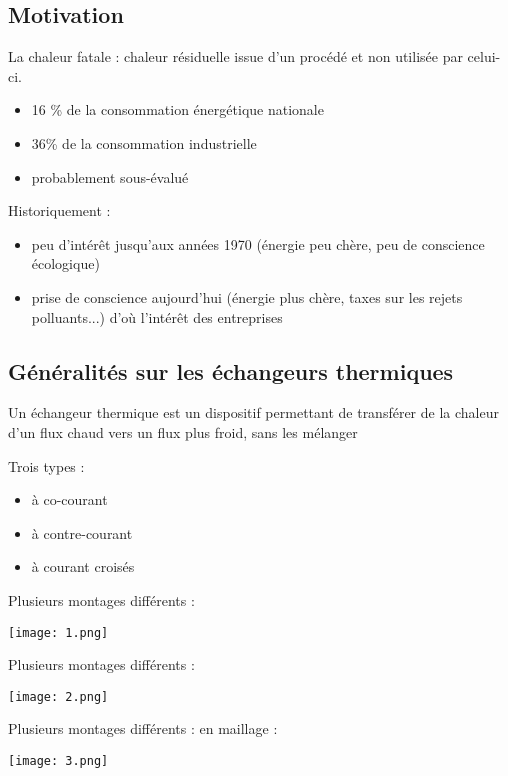 \documentclass{beamer}
\begin{document}
\subsection{Motivation}
\begin{frame}
La chaleur fatale : chaleur résiduelle issue d'un procédé et non utilisée par celui-ci.
\pause
\begin{itemize}
\item 16 \% de la consommation énergétique nationale

\pause 

\item 36\% de la consommation industrielle

\pause 

\item probablement sous-évalué\pause

\end{itemize}

Historiquement : \begin{itemize}
\item peu d'intérêt jusqu'aux années 1970 (énergie peu chère, peu de conscience écologique)\pause

\item prise de conscience aujourd'hui (énergie plus chère, taxes sur les rejets polluants...) d'où l'intérêt des entreprises
\end{itemize}


\end{frame}
\subsection{Généralités sur les échangeurs thermiques}
\begin{frame}
Un échangeur thermique est un dispositif permettant
de transférer de la chaleur d'un flux chaud vers un flux plus froid, sans les mélanger

Trois types : \begin{itemize}
\item à co-courant \pause
\item à contre-courant \pause
\item à courant croisés
\end{itemize}

\end{frame}
\begin{frame}

Plusieurs montages différents :  

{\texttt{[image: 1.png]}}

\end{frame}
\begin{frame}

Plusieurs montages différents :  

{\texttt{[image: 2.png]}}

\end{frame}
\begin{frame}

Plusieurs montages différents :  
en maillage :

{\texttt{[image: 3.png]}}

\end{frame}
\end{document}

